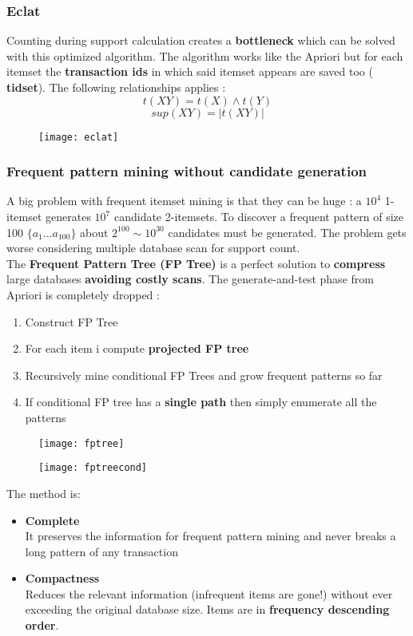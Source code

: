 \subsubsection{Eclat}
Counting during support calculation creates a \textbf{bottleneck} which can be solved with this optimized algorithm. The algorithm works like the Apriori but for each itemset the \textbf{transaction ids} in which said itemset appears are saved too ( \textbf{tidset}). The following relationships applies :
$$ t(XY) = t(X) \land t(Y)$$
$$ sup(XY) = |t(XY)|$$
 \begin{figure}[H]
  \centering
  \texttt{[image: eclat]}
\end{figure}

\subsubsection{Frequent pattern mining without candidate generation}
A big problem with frequent itemset mining is that they can be huge : a $10^4$ 1-itemset generates $10^7$ candidate 2-itemsets. To discover a frequent pattern of size 100 $\{a_1...a_100\}$ about $2^100 \sim 10^30$ candidates must be generated. The problem gets worse considering multiple database scan for support count.\\
The \textbf{Frequent Pattern Tree (FP Tree)} is a perfect solution to \textbf{compress} large databases \textbf{avoiding costly scans}. The generate-and-test phase from Apriori is completely dropped : 
\begin{enumerate}
\item Construct FP Tree
\item For each item i compute \textbf{projected FP tree}
\item Recursively mine conditional FP Trees and grow frequent patterns so far
\item If conditional FP tree has a \textbf{single path} then simply enumerate all the patterns
\end{enumerate}
 \begin{figure}[H]
  \centering
  \texttt{[image: fptree]}
\end{figure}
 \begin{figure}[H]
  \centering
  \texttt{[image: fptreecond]}
\end{figure}
The method is:
\begin{itemize}
\item \textbf{Complete}\\
It preserves the information for frequent pattern mining and never breaks a long pattern of any transaction
\item \textbf{Compactness}\\
Reduces the relevant information (infrequent items are gone!) without ever exceeding the original database size. Items are in \textbf{frequency descending order}.
\end{itemize}

